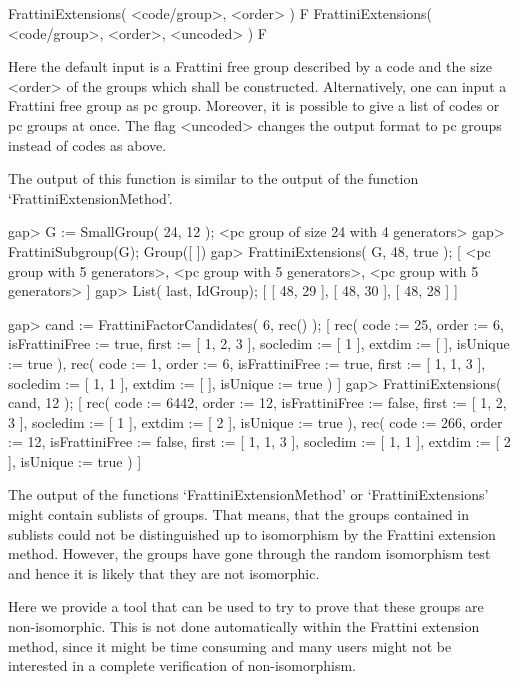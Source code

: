 \> FrattiniExtensions( <code/group>, <order> ) F
\> FrattiniExtensions( <code/group>, <order>, <uncoded> ) F

Here the default input is a Frattini free group described by a code
and the size <order> of the groups which shall be constructed. 
Alternatively, one can input a Frattini free group as pc group.
Moreover, it is possible to give a list of codes or pc groups at
once. The flag <uncoded> changes the output format to pc groups 
instead of codes as above.

The output of this function is similar to the output of the 
function `FrattiniExtensionMethod'. 

\beginexample
gap> G := SmallGroup( 24, 12 );
<pc group of size 24 with 4 generators>
gap> FrattiniSubgroup(G);
Group([  ])
gap> FrattiniExtensions( G, 48, true );
[ <pc group with 5 generators>, <pc group with 5 generators>, 
  <pc group with 5 generators> ]
gap> List( last, IdGroup);
[ [ 48, 29 ], [ 48, 30 ], [ 48, 28 ] ]

gap> cand := FrattiniFactorCandidates( 6, rec() );
[ rec( code := 25, order := 6, isFrattiniFree := true, first := [ 1, 2, 3 ], 
      socledim := [ 1 ], extdim := [  ], isUnique := true ), 
  rec( code := 1, order := 6, isFrattiniFree := true, first := [ 1, 1, 3 ], 
      socledim := [ 1, 1 ], extdim := [  ], isUnique := true ) ]
gap> FrattiniExtensions( cand, 12 );
[ rec( code := 6442, order := 12, isFrattiniFree := false, 
      first := [ 1, 2, 3 ], socledim := [ 1 ], extdim := [ 2 ], 
      isUnique := true ), 
  rec( code := 266, order := 12, isFrattiniFree := false, 
      first := [ 1, 1, 3 ], socledim := [ 1, 1 ], extdim := [ 2 ], 
      isUnique := true ) ]
\endexample


The output of the functions `FrattiniExtensionMethod' or `FrattiniExtensions' 
might contain sublists of groups. That means, that the groups contained
in sublists could not be distinguished up to isomorphism by the Frattini
extension method. However, the groups have gone through the random 
isomorphism test and hence it is likely that they are not isomorphic. 

Here we provide a tool that can be used to try to prove that these
groups are non-isomorphic. This is not done automatically within
the Frattini extension method, since it might be time consuming
and many users might not be interested in a complete verification 
of non-isomorphism.

